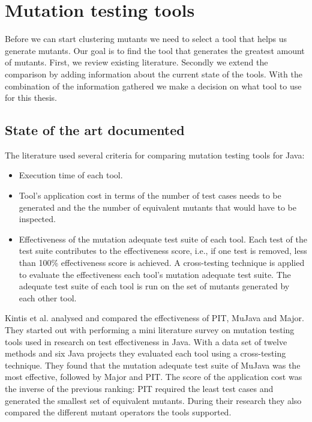 \documentclass[../main]{subfiles}
\begin{document}
\chapter{Mutation testing tools}
\label{ch:mutation-tool}

Before we can start clustering mutants we need to select a tool that helps us generate mutants. 
Our goal is to find the tool that generates the greatest amount of mutants. 
\newline
First, we review existing literature. 
Secondly we extend the comparison by adding information about the current state of the tools.
With the combination of the information gathered we make a decision on what tool to use for this thesis.

\section{State of the art documented}
\label{ch:tooling-literature}
The literature used several criteria for comparing mutation testing tools for Java:
\begin{itemize}
  \item Execution time of each tool.
  \item Tool's application cost in terms of the number of test cases needs to be generated and the the number of equivalent mutants that would have to be inspected.
  \item Effectiveness of the mutation adequate test suite of each tool. Each test of the test suite contributes to the
effectiveness score, i.e., if one test is removed, less than 100\% effectiveness score is achieved. A
cross-testing technique is applied to evaluate the effectiveness each tool’s mutation adequate test
suite. The adequate test suite of each tool is run on the set of mutants generated by each other tool.
\end{itemize}
Kintis et al. analysed and compared the effectiveness of PIT,  MuJava and Major\cite{Kintis2016AnalysingStudy}. 
They started out with performing a mini literature survey on mutation testing tools used in research on test effectiveness in Java. 
With a data set of twelve methods and six Java projects they evaluated each tool using a cross-testing technique.
They found that the mutation adequate test suite of  MuJava was the most effective, followed by Major and PIT.
The score of the application cost was the inverse of the previous ranking: PIT required the least test cases and generated the smallest set of equivalent mutants.
During their research they also compared the different mutant operators the tools supported. 
\end{document}
